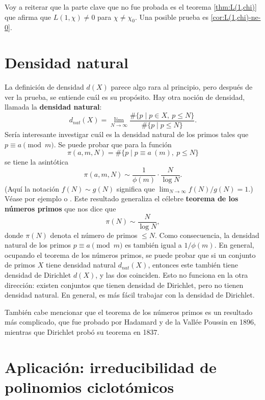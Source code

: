 \vspace{1em}

Voy a reiterar que la parte clave que no fue probada es el teorema
\ref{thm:L(1,chi)} que afirma que $L (1,\chi) \ne 0$ para $\chi \ne \chi_0$.
Una posible prueba es \ref{cor:L(1,chi)-ne-0}.


\section{Densidad natural}

La definición de densidad $d (X)$ parece algo rara al principio, pero después
de ver la prueba, se entiende cuál es su propósito. Hay otra noción de densidad,
llamada la \textbf{densidad natural}:
$$d_{nat} (X) = \lim_{N\to\infty} \frac{\# \{ p \mid p\in X, ~ p \le N \}}{\# \{ p \mid p \le N \}}.$$
Sería interesante investigar cuál es la densidad natural de los primos tales que
$p \equiv a \pmod{m}$. Se puede probar que para la función
$$\pi (a,m,N) = \# \{ p \mid p \equiv a ~ (m), ~ p \le N \}$$
se tiene la asintótica
$$\pi (a,m,N) \sim \frac{1}{\phi (m)}\cdot \frac{N}{\log N}.$$
(Aquí la notación $f (N) \sim g (N)$ significa que
$\lim_{N\to\infty} f(N)/g(N) = 1$.) Véase por ejemplo
\cite[Chapter~7]{Everiste-ANT} o
\cite[Chapter~6]{Hlawka-Taschner-Schoissengeier}.
Este resultado generaliza el célebre \textbf{teorema de los números primos}
que nos dice que
$$\pi (N) \sim \frac{N}{\log N},$$
donde $\pi (N)$ denota el número de primos $\le N$. Como consecuencia,
la densidad natural de los primos $p \equiv a \pmod{m}$ es también igual a
$1/\phi(m)$. En general, ocupando el teorema de los números primos, se puede
probar que si un conjunto de primos $X$ tiene densidad natural $d_{nat} (X)$,
entonces este también tiene densidad de Dirichlet $d (X)$, y las dos coinciden.
Esto no funciona en la otra dirección: existen conjuntos que tienen densidad
de Dirichlet, pero no tienen densidad natural. En general, es más fácil trabajar
con la densidad de Dirichlet.

También cabe mencionar que el teorema de los números primos es un resultado más
complicado, que fue probado por Hadamard y de la Vallée Poussin en 1896,
mientras que Dirichlet probó su teorema en 1837.


\section{Aplicación: irreducibilidad de polinomios ciclotómicos}
\label{sec:irreducibilidad-de-Phi-Dirichlet}

